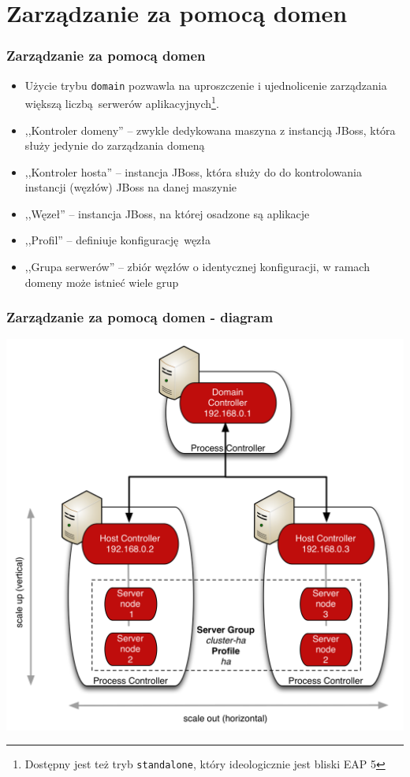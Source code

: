 \documentclass[dvipsnames,table]{beamer}
\begin{document}
\section{Zarządzanie za pomocą domen}

\begin{frame}
\frametitle{Zarządzanie za pomocą domen}
\begin{itemize}
	\item Użycie trybu {\tt domain} pozwawla na uproszczenie i ujednolicenie zarządzania większą liczbą serwerów aplikacyjnych\footnote{Dostępny jest też tryb {\tt standalone}, który ideologicznie jest bliski EAP 5}.
	\item ,,Kontroler domeny'' -- zwykle dedykowana maszyna z instancją JBoss, która służy jedynie do zarządzania domeną
	\item ,,Kontroler hosta'' -- instancja JBoss, która służy do do kontrolowania instancji (węzłów) JBoss na danej maszynie
	\item ,,Węzeł'' -- instancja JBoss, na której osadzone są aplikacje
	\item ,,Profil'' -- definiuje konfigurację węzła
	\item ,,Grupa serwerów'' -- zbiór węzłów o identycznej konfiguracji, w ramach domeny może istnieć wiele grup
\end{itemize}

\end{frame}

\begin{frame}
\frametitle{Zarządzanie za pomocą domen - diagram}
\begin{center}
	\includegraphics[scale=0.42]{img-domain-mode.png}
\end{center}
\end{frame}
\end{document}
